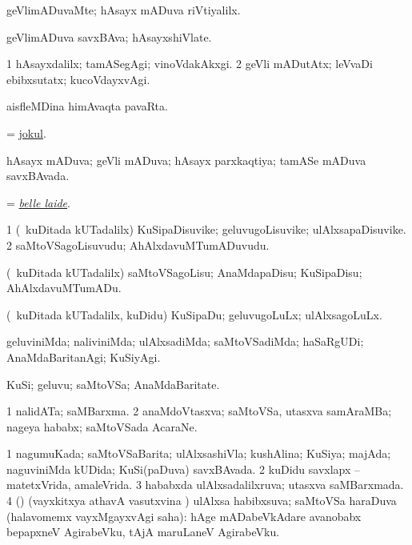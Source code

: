 \bentry
{}
\gl{\kirxvi}
\bmng
geVlimADuvaMte; hAsayx mADuva riVtiyalilx. 
\emng
\eentry

\bentry
{}
\gl{\nA}
\bmng
geVlimADuva savxBAva; hAsayxshiVlate. 
\emng
\eentry

\bentry
{}
\gl{\kirxvi}
\bmng
\bnum
\num{1} hAsayxdalilx; tamASegAgi; vinoVdakAkxgi. 
\num{2} geVli mADutAtx; leVvaDi ebibxsutatx; kucoVdayxvAgi. 
\enum
\emng
\eentry

\bentry
{}
\gl{\nA}
\bmng
aisfleMDina himAvaqta pavaRta. 
\emng
\eentry

\bentry
{}
\gl{\nA}
\bmng
 = \hyperlink{jokul}{jokul}. 
\emng
\eentry

\bentry
{}
\gl{\gu}
\bmng
hAsayx mADuva; geVli mADuva; hAsayx parxkaqtiya; tamASe mADuva savxBAvada. 
\emng
\eentry

\bentry
{}
\gl{\nA}
\bmng
= \hyperref{kandict_b.pdf}{B}{belle laide}{\it belle laide}. 
\emng
\eentry

\bentry
{}
\gl{\nA}
\bmng
\bnum
\num{1} (\kanmu\ kuDitada kUTadalilx) KuSipaDisuvike; geluvugoLisuvike; ulAlxsapaDisuvike. 
\num{2} saMtoVSagoLisuvudu; AhAlxdavuMTumADuvudu. 
\enum
\emng
\eentry

\bentry
{}
\gl{\sakirx}
\bmng
(\kanmu\ kuDitada kUTadalilx) saMtoVSagoLisu; AnaMdapaDisu; KuSipaDisu; AhAlxdavuMTumADu. 
\emng

\noindent
\gl{\akirx}
\bmng
(\kanmu\ kuDitada kUTadalilx, kuDidu) KuSipaDu; geluvugoLuLx; ulAlxsagoLuLx. 
\emng
\eentry

\bentry
{}
\gl{\kirxvi}
\bmng
geluviniMda; naliviniMda; ulAlxsadiMda; saMtoVSadiMda; haSaRgUDi; AnaMdaBaritanAgi; KuSiyAgi. 
\emng
\eentry

\bentry
{}
\gl{\nA}
\bmng
KuSi; geluvu; saMtoVSa; AnaMdaBaritate. 
\emng
\eentry

\bentry
{}
\gl{\nA}
\bmng
\bnum
\num{1} nalidATa; saMBarxma. 
\num{2} anaMdoVtasxva; saMtoVSa, utasxva samAraMBa; nageya hababx; saMtoVSada AcaraNe. 
\enum
\emng
\eentry

\bentry
{}
\gl{\gu}
\bmng
\bnum
\num{1} nagumuKada; saMtoVSaBarita; ulAlxsashiVla; kushAlina; KuSiya; majAda; naguviniMda kUDida; KuSi(paDuva) savxBAvada. 
\num{2} kuDidu savxlapx -- matetxVrida, amaleVrida. 
\num{3} hababxda ulAlxsadalilxruva; utasxva saMBarxmada. 
\num{4} (\AmA) (vayxkitxya athavA vasutxvina \vi) ulAlxsa habibxsuva; saMtoVSa haraDuva (halavomemx vayxMgayxvAgi saha):  hAge mADabeVkAdare avanobabx bepapxneV AgirabeVku, tAjA maruLaneV AgirabeVku. 
\enum
\emng

